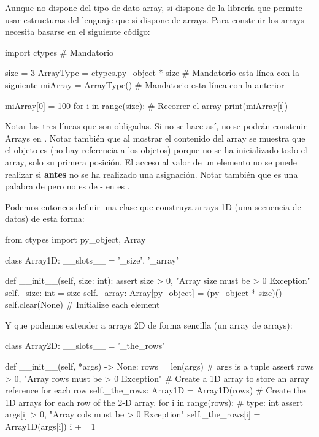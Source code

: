 Aunque  no dispone del tipo de dato array,  si dispone de la librería  que permite usar estructuras del lenguaje  que sí dispone de arrays. Para construir los arrays  necesita basarse en el siguiente código:

\begin{pyconsole}[][frame=single]
import ctypes   # Mandatorio 

size = 3
ArrayType = ctypes.py_object * size # Mandatorio esta línea con la siguiente
miArray = ArrayType()               # Mandatorio esta línea con la anterior

miArray[0] = 100
for i in range(size):      # Recorrer el array
  print(miArray[i])        

\end{pyconsole}
Notar las tres líneas que son obligadas. Si no se hace así, no se podrán construir Arrays en . Notar también que al mostrar el contenido del array se muestra que el objeto es  (no hay referencia a los objetos) porque no se ha inicializado todo el array, solo su primera posición. El acceso al valor de un elemento no se puede realizar si \textbf{antes} no se ha realizado una asignación. Notar también que  es una palabra de  pero no es de  - en  es .

Podemos entonces definir una clase que construya arrays 1D (una secuencia de datos) de esta forma: \label{code:array1D}
\begin{pyverbatim}[][frame=single]
from ctypes import py_object, Array

class Array1D:
    __slots__ = '_size', '_array'

    def __init__(self, size: int):
        assert size > 0, "Array size must be > 0 Exception"
        self._size: int = size
        self._array: Array[py_object] = (py_object * size)()
        self.clear(None) # Initialize each element
\end{pyverbatim}


Y que podemos extender a arrays 2D de forma sencilla (un array de arrays):

\begin{pyverbatim}[][frame=single]
class Array2D:
    __slots__ = '_the_rows'

    def __init__(self,  *args) -> None:
        rows = len(args)  # args is a tuple
        assert rows > 0, "Array rows must be > 0 Exception"
        # Create a 1D array to store an array reference for each row
        self._the_rows: Array1D = Array1D(rows)
        # Create the 1D arrays for each row of the 2-D array.
        for i in range(rows):  # type: int
            assert args[i] > 0, "Array cols must be > 0 Exception"
            self._the_rows[i] = Array1D(args[i])
            i += 1
\end{pyverbatim}





